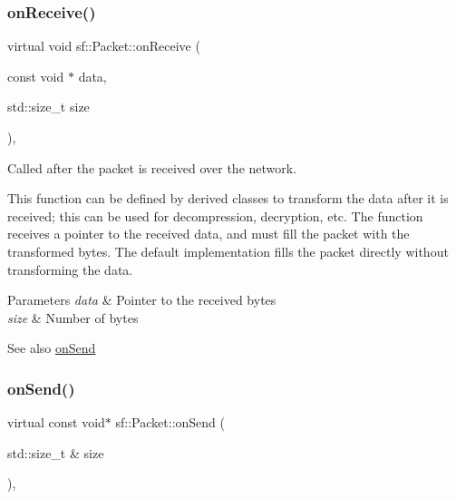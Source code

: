 \subsubsection{\texorpdfstring{onReceive()}{onReceive()}}
{\footnotesize\ttfamily virtual void sf\+::\+Packet\+::on\+Receive (\begin{DoxyParamCaption}\item[{const void $\ast$}]{data,  }\item[{std\+::size\+\_\+t}]{size }\end{DoxyParamCaption})\hspace{0.3cm}{\ttfamily [protected]}, {\ttfamily [virtual]}}



Called after the packet is received over the network. 

This function can be defined by derived classes to transform the data after it is received; this can be used for decompression, decryption, etc. The function receives a pointer to the received data, and must fill the packet with the transformed bytes. The default implementation fills the packet directly without transforming the data.


\begin{DoxyParams}{Parameters}
{\em data} & Pointer to the received bytes \\
\hline
{\em size} & Number of bytes\\
\hline
\end{DoxyParams}
\begin{DoxySeeAlso}{See also}
\mbox{\hyperlink{classsf_1_1_packet_a052e955906c9bfd671622cb625380edc}{on\+Send}} \begin{DoxyVerb}\end{DoxyVerb}
 
\end{DoxySeeAlso}
\mbox{\label{classsf_1_1_packet_a052e955906c9bfd671622cb625380edc}} 
\subsubsection{\texorpdfstring{onSend()}{onSend()}}
{\footnotesize\ttfamily virtual const void$\ast$ sf\+::\+Packet\+::on\+Send (\begin{DoxyParamCaption}\item[{std\+::size\+\_\+t \&}]{size }\end{DoxyParamCaption})\hspace{0.3cm}{\ttfamily [protected]}, {\ttfamily [virtual]}}



